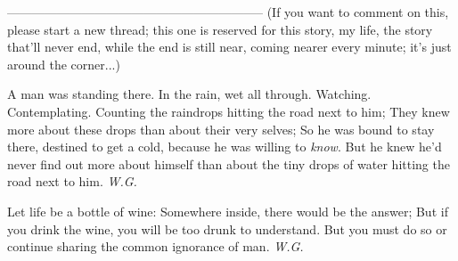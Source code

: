 --------------------------------------------------------------
(If you want to comment on this, please start a new thread; this one is reserved for this story, my life, the story that'll never end, while the end is still near, coming nearer every minute; it's just around the corner...)

A man was standing there. 
In the rain, wet all through. 
Watching. 
Contemplating. 
Counting the raindrops hitting the road 
next to him; 
They knew more about these drops 
than about their very selves; 
So he was bound to stay there, 
destined to get a cold, 
because he was willing to \emph{know}. 
But he knew he'd never find out 
more about himself 
than about the tiny drops of water 
hitting the road 
next to him. 
\emph{W.G.}

Let life be a bottle of wine: 
Somewhere inside, there would be 
the answer; 
But if you drink the wine, 
you will be too drunk to understand. 
But you must do so 
or continue sharing 
the common ignorance 
of man. 
\emph{W.G.}

